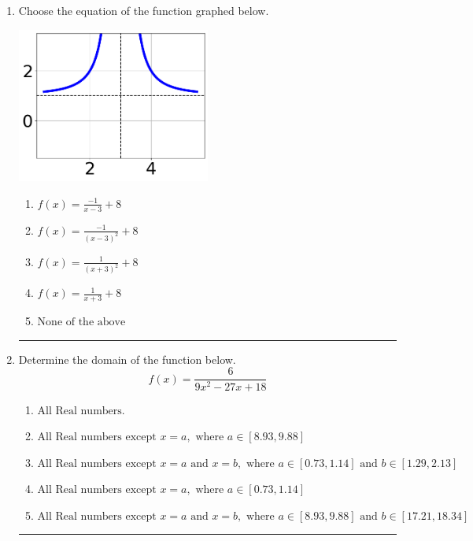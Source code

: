 \documentclass[14pt]{extbook}
\newcommand{\litem}[1]{\item#1\hspace*{-1cm}\rule{\textwidth}{0.4pt}}
\begin{document}
\begin{enumerate}
{\begin{enumerate}[label=\Alph*.]
\end{enumerate} }
\litem{
Choose the equation of the function graphed below.
\begin{center}
    \includegraphics[width=0.5\textwidth]{../Figures/rationalGraphToEquationA.png}
\end{center}
\begin{enumerate}[label=\Alph*.]
\item \( f(x) = \frac{-1}{x - 3} + 8 \)
\item \( f(x) = \frac{-1}{(x - 3)^2} + 8 \)
\item \( f(x) = \frac{1}{(x + 3)^2} + 8 \)
\item \( f(x) = \frac{1}{x + 3} + 8 \)
\item \( \text{None of the above} \)

\end{enumerate} }
\litem{
Determine the domain of the function below.\[ f(x) = \frac{6}{9x^{2} -27 x + 18} \]\begin{enumerate}[label=\Alph*.]
\item \( \text{All Real numbers.} \)
\item \( \text{All Real numbers except } x = a, \text{ where } a \in [8.93, 9.88] \)
\item \( \text{All Real numbers except } x = a \text{ and } x = b, \text{ where } a \in [0.73, 1.14] \text{ and } b \in [1.29, 2.13] \)
\item \( \text{All Real numbers except } x = a, \text{ where } a \in [0.73, 1.14] \)
\item \( \text{All Real numbers except } x = a \text{ and } x = b, \text{ where } a \in [8.93, 9.88] \text{ and } b \in [17.21, 18.34] \)


\end{enumerate}}
\end{enumerate}
\end{document}
